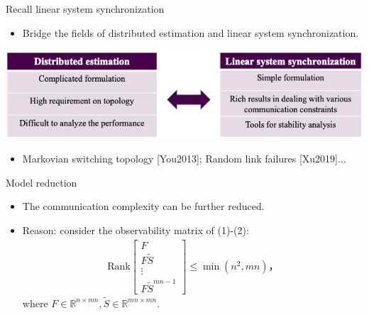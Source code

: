 \documentclass[10pt]{beamer}
\DeclareMathOperator{\1}{\textbf{1}}
\begin{document}
\begin{frame}{Recall linear system synchronization}
	\begin{itemize}
		\item Bridge the fields of distributed estimation and linear system synchronization.
	    \end{itemize}
    	\includegraphics[width=1\textwidth]{pic/bridge}
    		\begin{itemize}
	\item Markovian switching topology [You2013]; Random link failures [Xu2019]...
    	\end{itemize}
\end{frame}

\begin{frame}{Model reduction}
	\begin{itemize}
		\item The communication complexity can be further reduced.
		\item Reason: consider the observability matrix of (1)-(2):
		\begin{align*}
		\text{Rank}\begin{bmatrix}
		F\\
		F\tilde S\\
		\vdots\\
		F\tilde S^{mn-1}
		\end{bmatrix}\le \min(n^2,mn)，
		\end{align*}
		where $F\in\mathbb{R}^{n\times mn}, \tilde S\in\mathbb{R}^{mn\times mn}$.
	\end{itemize}
\end{frame}
\end{document}
